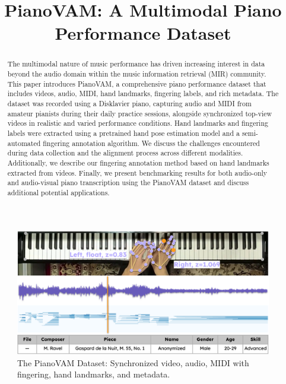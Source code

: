 \documentclass{article}
\title{PianoVAM: A Multimodal Piano Performance Dataset}
\begin{document}
\maketitle

\begin{abstract}
The multimodal nature of music performance has driven increasing interest in data beyond the audio domain within the music information retrieval (MIR) community. This paper introduces PianoVAM, a comprehensive piano performance dataset that includes videos, audio, MIDI, hand landmarks, fingering labels, and rich metadata. The dataset was recorded using a Disklavier piano, capturing audio and MIDI from amateur pianists during their daily practice sessions, alongside synchronized top-view videos in realistic and varied performance conditions. Hand landmarks and fingering labels were extracted using a pretrained hand pose estimation model and a semi-automated fingering annotation algorithm. We discuss the challenges encountered during data collection and the alignment process across different modalities. Additionally, we describe our fingering annotation method based on hand landmarks extracted from videos. Finally, we present benchmarking results for both audio-only and audio-visual piano transcription using the PianoVAM dataset and discuss additional potential applications.

\end{abstract}

\begin{figure}
    \centering
    \includegraphics[width=1\linewidth]{Images/teaser_image.png}
    \caption{The PianoVAM Dataset: Synchronized video, audio, MIDI with fingering, hand landmarks, and metadata.}
    \label{fig:overview}
\vspace{-5mm}    
\end{figure}
\end{document}
